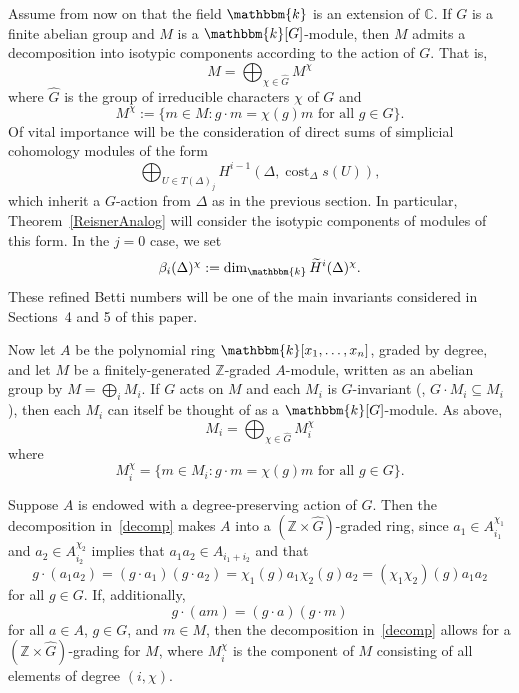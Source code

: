 \documentclass[ALCO,ThmDefs,Unicode]{cedram}
\DeclareMathOperator\cost{cost}
\newcommand{\field}{\mathbbm{k}}
\newcommand{\CC}{{\mathbb C}}
\newcommand{\ZZ}{{\mathbb Z}}
\begin{document}
Assume from now on that the field $\field$ is an extension of $\CC$. If $G$ is a finite abelian group and $M$ is a $\field[G]$-module, then $M$ admits a decomposition into isotypic components according to the action of $G$. That is,
\[
M=\bigoplus_{\chi\in\hat{G}} M^\chi
\]
where $\hat{G}$ is the group of irreducible characters $\chi$ of $G$ and
\[
M^\chi := \{ m\in M: g\cdot m = \chi(g) m\text{ for all $g\in G$}\}.
\]
Of vital importance will be the consideration of direct sums of simplicial cohomology modules of the form
\[
\bigoplus_{U\in T(\Delta)_j}H^{i-1}(\Delta, \cost_\Delta s(U)),
\]
which inherit a $G$-action from $\Delta$ as in the previous section. In particular, Theorem~\ref{ReisnerAnalog} will consider the isotypic components of modules of this form. In the $j=0$ case, we set
\begin{equation}\label{bettinotation}
\beta_i(\Delta)^\chi:=\dim_\field \widetilde{H}^i(\Delta)^\chi.
\end{equation}
These refined Betti numbers will be one of the main invariants considered in Sections~4 and 5 of this paper.


Now let $A$ be the polynomial ring $\field[x_1, \ldots, x_n]$, graded by degree, and let $M$ be a finitely-generated $\ZZ$-graded $A$-module, written as an abelian group by $M=\bigoplus_i M_i$. If $G$ acts on $M$ and each $M_i$ is $G$-invariant (\ie, $G\cdot M_i\subseteq M_i$), then each $M_i$ can itself be thought of as a $\field[G]$-module. As above,
\begin{equation}\label{decomp}
M_i=\bigoplus_{\chi\in\hat{G}} M_i^\chi
\end{equation}
where
\[
M_i^\chi=\{m\in M_i:g\cdot m = \chi(g)m\text{ for all $g\in G$}\}.
\]

Suppose $A$ is endowed with a degree-preserving action of $G$. Then the decomposition in~\eqref{decomp} makes $A$ into a $(\ZZ\times \hat{G})$-graded ring, since $a_1\in A_{i_1}^{\chi_1}$ and $a_2\in A_{i_2}^{\chi_2}$ implies that $a_1a_2\in A_{i_1+i_2}$ and that
\[
g\cdot(a_1a_2)=(g\cdot a_1)(g\cdot a_2)=\chi_1(g)a_1\chi_2(g)a_2=(\chi_1\chi_2)(g)a_1a_2
\]
for all $g\in G$. If, additionally,
\begin{equation}\label{compatible}
g\cdot(am)=(g\cdot a)(g\cdot m)
\end{equation}
for all $a\in A$, $g\in G$, and $m\in M$, then the decomposition in~\eqref{decomp} allows for a $(\ZZ\times \hat{G})$-grading for $M$, where $M_i^\chi$ is the component of $M$ consisting of all elements of degree $(i, \chi)$.
\end{document}
